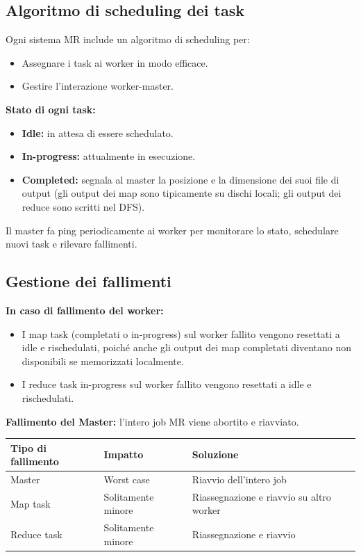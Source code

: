 \subsection{Algoritmo di scheduling dei task}

Ogni sistema MR include un algoritmo di scheduling per:
\begin{itemize}
  \item Assegnare i task ai worker in modo efficace.
  \item Gestire l'interazione worker-master.
\end{itemize}

\textbf{Stato di ogni task:}
\begin{itemize}
  \item \textbf{Idle:} in attesa di essere schedulato.
  \item \textbf{In-progress:} attualmente in esecuzione.
  \item \textbf{Completed:} segnala al master la posizione e la dimensione
    dei suoi file di output (gli output dei map sono tipicamente su dischi
    locali; gli output dei reduce sono scritti nel DFS).
\end{itemize}

Il master fa ping periodicamente ai worker per monitorare lo stato,
schedulare nuovi task e rilevare fallimenti.

\subsection{Gestione dei fallimenti}

\textbf{In caso di fallimento del worker:}
\begin{itemize}
  \item I map task (completati o in-progress) sul worker fallito vengono
    resettati a idle e rischedulati, poiché anche gli output dei map
    completati diventano non disponibili se memorizzati localmente.
  \item I reduce task in-progress sul worker fallito vengono resettati
    a idle e rischedulati.
\end{itemize}

\textbf{Fallimento del Master:} l'intero job MR viene abortito e riavviato.

\begin{tabular}{@{}lll@{}}
  \toprule
  \textbf{Tipo di fallimento} & \textbf{Impatto} & \textbf{Soluzione} \\
  \midrule
  Master   & Worst case & Riavvio dell'intero job \\
  Map task & Solitamente minore & Riassegnazione e riavvio su altro worker \\
  Reduce task & Solitamente minore & Riassegnazione e riavvio \\
  \bottomrule
\end{tabular}

